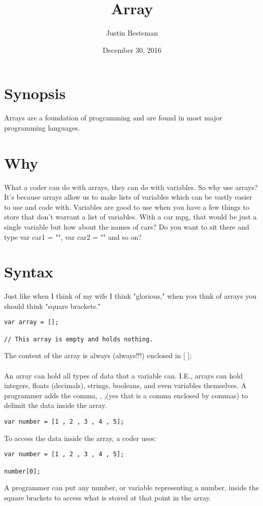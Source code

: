 \documentclass[12pt, letterpaper]{article}
\title{Array}
\author{Justin Besteman}
\date{December 30, 2016}
\begin{document}
\maketitle


\section*{Synopsis}

Arrays are a foundation of programming and are found in most major programming languages.

\section*{Why}

What a coder can do with arrays, they can do with variables. So why use arrays? It's because arrays allow us to make lists of variables which can be vastly easier to use and code with. Variables are good to use when you have a few things to store that don't warrant a list of variables. With a car mpg, that would be just a single variable but how about the names of cars? Do you want to sit there and type var car1 = "", var car2 = "" and so on? \\


\section*{Syntax}

Just like when I think of my wife I think "glorious," when you thnk of arrays you should think "square brackets."
\begin{lstlisting}
var array = [];

// This array is empty and holds nothing. 
\end{lstlisting}
The content of the array is always (always!!!) enclosed in [ ];\\ \\
An array can hold all types of data that a variable can. I.E., arrays can hold integers, floats (decimals), strings, booleans, and even variables themselves. A programmer adds the comma, , ,(yes that is a comma enclosed by commas) to delimit the data inside the array.\\
\begin{lstlisting}
var number = [1 , 2 , 3 , 4 , 5];
\end{lstlisting}
To access the data inside the array, a coder uses: 
\begin{lstlisting}
var number = [1 , 2 , 3 , 4 , 5];

number[0];
\end{lstlisting}
A programmer can put any number, or variable representing a number, inside the square brackets to access what is stored at that point in the array. 
\end{document}
